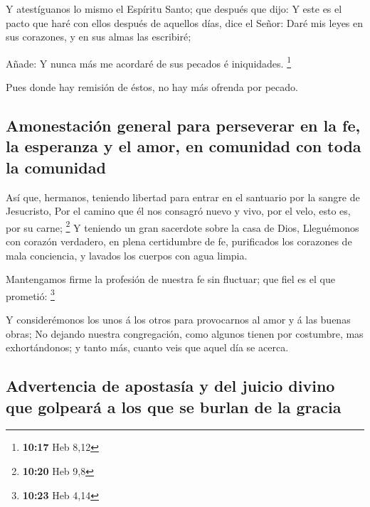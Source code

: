  Y atestíguanos lo mismo el Espíritu Santo; que después
que dijo:  Y este es el pacto que haré con ellos después
de aquellos días, dice el Señor: Daré mis leyes en sus corazones, y en
sus almas las escribiré;

 Añade: Y nunca más me acordaré de sus pecados é
iniquidades. \footnote{\textbf{10:17} Heb 8,12}

 Pues donde hay remisión de éstos, no hay más ofrenda por
pecado.

\hypertarget{amonestaciuxf3n-general-para-perseverar-en-la-fe-la-esperanza-y-el-amor-en-comunidad-con-toda-la-comunidad}{%
\subsection{Amonestación general para perseverar en la fe, la esperanza
y el amor, en comunidad con toda la
comunidad}\label{amonestaciuxf3n-general-para-perseverar-en-la-fe-la-esperanza-y-el-amor-en-comunidad-con-toda-la-comunidad}}

 Así que, hermanos, teniendo libertad para entrar en el
santuario por la sangre de Jesucristo,  Por el camino que
él nos consagró nuevo y vivo, por el velo, esto es, por su carne;
\footnote{\textbf{10:20} Heb 9,8}  Y teniendo un gran
sacerdote sobre la casa de Dios,  Lleguémonos con corazón
verdadero, en plena certidumbre de fe, purificados los corazones de mala
conciencia, y lavados los cuerpos con agua limpia.

 Mantengamos firme la profesión de nuestra fe sin
fluctuar; que fiel es el que prometió: \footnote{\textbf{10:23} Heb 4,14}

 Y considerémonos los unos á los otros para provocarnos
al amor y á las buenas obras;  No dejando nuestra
congregación, como algunos tienen por costumbre, mas exhortándonos; y
tanto más, cuanto veis que aquel día se acerca.

\hypertarget{advertencia-de-apostasuxeda-y-del-juicio-divino-que-golpearuxe1-a-los-que-se-burlan-de-la-gracia}{%
\subsection{Advertencia de apostasía y del juicio divino que golpeará a
los que se burlan de la
gracia}\label{advertencia-de-apostasuxeda-y-del-juicio-divino-que-golpearuxe1-a-los-que-se-burlan-de-la-gracia}}

